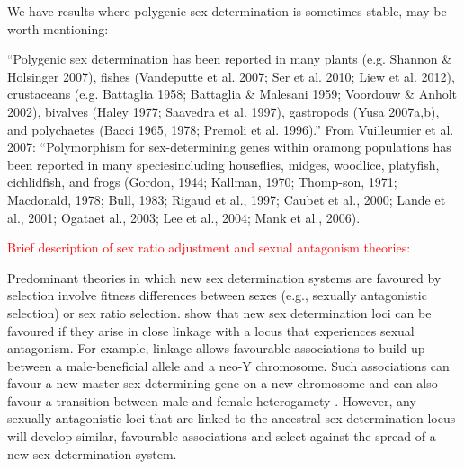 \documentclass[12pt]{article}
\begin{document}
\noindent
We have results where polygenic sex determination is sometimes stable, may be worth mentioning:

``Polygenic sex determination has been reported in many plants (e.g. Shannon \& Holsinger 2007), fishes (Vandeputte et al. 2007; Ser et al. 2010; Liew et al. 2012), crustaceans (e.g. Battaglia 1958; Battaglia \& Malesani 1959; Voordouw
\& Anholt 2002), bivalves (Haley 1977; Saavedra et al. 1997), gastropods (Yusa 2007a,b), and polychaetes (Bacci 1965, 1978; Premoli et al. 1996).''
From Vuilleumier et al. 2007:
``Polymorphism for sex-determining genes within oramong populations has been reported in many speciesincluding houseflies, midges, woodlice, platyfish, cichlidfish, and frogs (Gordon, 1944; Kallman, 1970; Thomp-son, 1971; Macdonald, 1978; Bull, 1983; Rigaud et al., 1997; Caubet et al., 2000; Lande et al., 2001; Ogataet al., 2003; Lee et al., 2004; Mank et al., 2006).



\noindent
\textcolor{red}{Brief description of sex ratio adjustment and sexual antagonism theories:}

Predominant theories in which new sex determination systems are favoured by selection involve fitness differences between sexes (e.g., sexually antagonistic selection) or sex ratio selection.
\citet{vanDoorn:2007eu,vanDoorn:2010hu} show that new sex determination loci can be favoured if they arise in close linkage with a locus that experiences sexual antagonism. 
For example, linkage allows favourable associations to build up between a male-beneficial allele and a neo-Y chromosome. 
Such associations can favour a new master sex-determining gene on a new chromosome \citep{vanDoorn:2007eu} and can also favour a transition between male and female heterogamety \citep[e.g., a ZW to XY transition,][]{vanDoorn:2010hu}.
However, any sexually-antagonistic loci that are linked to the ancestral sex-determination locus will develop similar, favourable associations and select against the spread of a new sex-determination system. 
\end{document}

